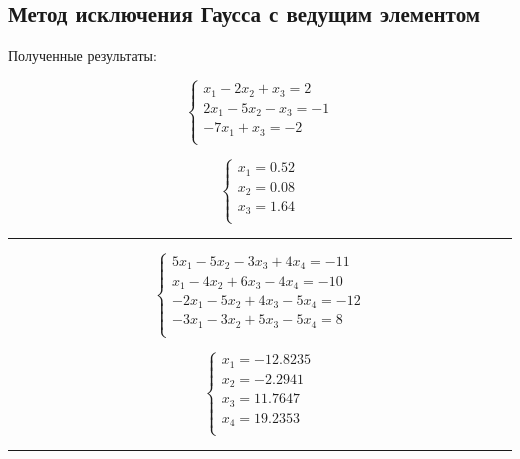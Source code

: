 \documentclass{article}
\begin{document}
\subsection{Метод исключения Гаусса с ведущим элементом}
Полученные результаты:
\begin{multicols}{2}
\begin{displaymath}
  \left\{ \begin{array}{ll}
  x_{1} - 2x_{2} + x_{3} = 2\\
  2x_{1} - 5x_{2} - x_{3} = -1\\
  -7x_{1} + x_{3} = -2\\
\end{array} \right.
\end{displaymath}

\begin{displaymath}
\left\{ \begin{array}{ll}
  x_{1} = 0.52\\
  x_{2} = 0.08\\
  x_{3} = 1.64\\
\end{array} \right.
\end{displaymath}
\end{multicols}
\rule[1mm]{10cm}{0.1mm}
\begin{multicols}{2}
\begin{displaymath}
  \left\{ \begin{array}{ll}
  5x_{1} - 5x_{2} - 3x_{3} + 4x_{4} = -11\\
  x_{1} - 4x_{2} + 6x_{3} - 4x_{4} = -10\\
  -2x_{1} - 5x_{2} + 4x_{3} - 5x_{4} = -12\\
  -3x_{1} - 3x_{2} + 5x_{3} - 5x_{4} = 8\\
\end{array} \right.
\end{displaymath}

\begin{displaymath}
\left\{ \begin{array}{ll}
  x_{1} = -12.8235\\
  x_{2} = -2.2941\\
  x_{3} = 11.7647\\
  x_{4} = 19.2353\\
\end{array} \right.
\end{displaymath}
\end{multicols}
\rule[1mm]{10cm}{0.1mm}
\end{document}
